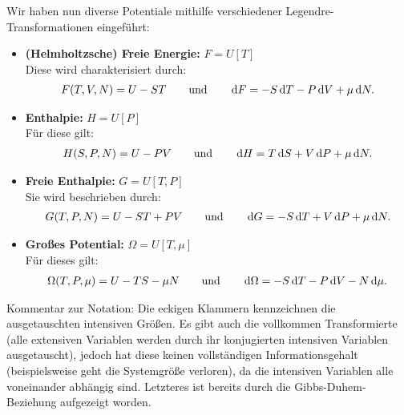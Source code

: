 \begin{summary}
        Wir haben nun diverse Potentiale mithilfe verschiedener Legendre-Transformationen eingeführt:
        \begin{itemize}
            \item \textbf{(Helmholtzsche) Freie Energie:} $F=U[T]$ \\
            Diese wird charakterisiert durch:
            \begin{align*}
                F(T,V,N)=U-ST \qquad \mathrm{und} \qquad \mathop{}\!\mathrm{d} F=-S\mathop{}\!\mathrm{d} T-P\mathop{}\!\mathrm{d} V+\mu \mathop{}\!\mathrm{d} N.
            \end{align*}
            \item \textbf{Enthalpie:} $H=U[P]$ \\
            Für diese gilt:
            \begin{align*}
                H(S,P,N)=U-PV \qquad \mathrm{und} \qquad \mathop{}\!\mathrm{d} H=T\mathop{}\!\mathrm{d} S+V\mathop{}\!\mathrm{d} P+\mu \mathop{}\!\mathrm{d} N.
            \end{align*}
            \item \textbf{Freie Enthalpie:} $G=U[T,P]$\\
            Sie wird beschrieben durch:
            \begin{align*}
                G(T,P,N)=U-ST+PV \qquad \mathrm{und} \qquad \mathop{}\!\mathrm{d} G=-S\mathop{}\!\mathrm{d} T+V\mathop{}\!\mathrm{d} P+\mu \mathop{}\!\mathrm{d} N.
            \end{align*}
            \item \textbf{Großes Potential:} $\Omega=U[T,\mu]$\\
            Für dieses gilt:
            \begin{align*}
                \Omega (T,P,\mu)=U-TS-\mu N \qquad \mathrm{und} \qquad \mathop{}\!\mathrm{d} \Omega=-S\mathop{}\!\mathrm{d} T-P\mathop{}\!\mathrm{d} V-N \mathop{}\!\mathrm{d} \mu.
            \end{align*}
        \end{itemize}
        Kommentar zur Notation: Die eckigen Klammern kennzeichnen die ausgetauschten intensiven Größen.
        Es gibt auch die vollkommen Transformierte (alle extensiven Variablen werden durch ihr konjugierten intensiven Variablen ausgetauscht), jedoch hat diese keinen vollständigen Informationsgehalt (beispielsweise geht die Systemgröße verloren), da die intensiven Variablen alle voneinander abhängig sind. Letzteres ist bereits durch die Gibbs-Duhem-Beziehung aufgezeigt worden. 
    \end{summary}
